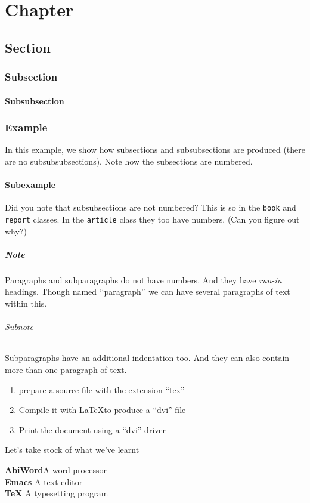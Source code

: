 \documentclass{book}
\begin{document}
\chapter{Chapter}
\section{Section}
\subsection{Subsection}
\subsubsection{Subsubsection}

\subsection{Example}
In this example, we show how subsections and subsubsections
are produced (there are no subsubsubsections). Note how the
subsections are numbered.
\subsubsection{Subexample}
Did you note that subsubsections are not numbered? This is so in the
\texttt{book} and \texttt{report} classes. In the \texttt{article}
class they too have numbers. (Can you figure out why?)
\paragraph{Note}
Paragraphs and subparagraphs do not have numbers. And they have
\textit{run-in} headings.
Though named ‘‘paragraph’’ we can have several paragraphs of text within this.
\subparagraph{Subnote}
Subparagraphs have an additional indentation too.
And they can also contain more than one paragraph of text.

\begin{enumerate}
\item prepare a source file with the extension ``tex''
\item Compile it with \LaTeX to produce a ``dvi'' file
\item Print the document using a ``dvi'' driver
\end{enumerate}

Let’s take stock of what we’ve learnt
\begin{tabbing}
\hspace{1cm}\= \textbf{AbiWord}\quad\= A word processor\\[5pt]
\> \textbf{Emacs} \> A text editor\\[5pt]
\> \textbf{\TeX} \> A typesetting program
\end{tabbing}
\end{document}
